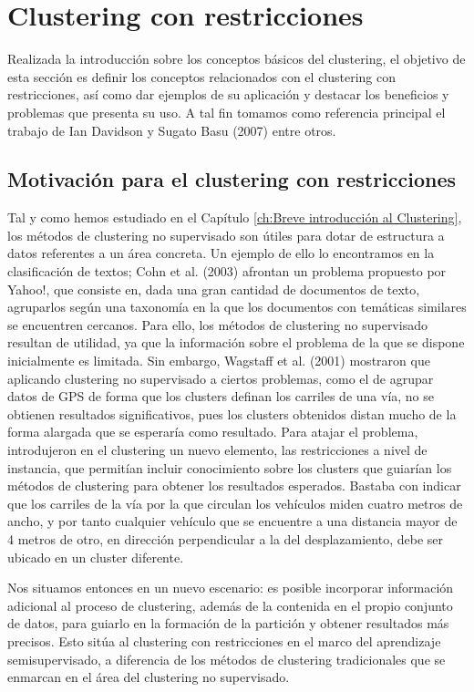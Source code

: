 \chapter{Clustering con restricciones}\label{ch:Clustering con restricciones}

Realizada la introducción sobre los conceptos básicos del clustering, el objetivo de esta sección es definir los conceptos relacionados con el clustering con restricciones, así como dar ejemplos de su aplicación y destacar los beneficios y problemas que presenta su uso. A tal fin tomamos como referencia principal el trabajo de Ian Davidson y Sugato Basu (2007) \cite{Survey:2007} entre otros.

\section{Motivación para el clustering con restricciones}

Tal y como hemos estudiado en el Capítulo \ref{ch:Breve introducción al Clustering}, los métodos de clustering no supervisado son útiles para dotar de estructura a datos referentes a un área concreta. Un ejemplo de ello lo encontramos en la clasificación de textos; Cohn et al. (2003) \cite{Cohn:2003} afrontan un problema propuesto por Yahoo!, que consiste en, dada una gran cantidad de documentos de texto, agruparlos según una taxonomía en la que los documentos con temáticas similares se encuentren cercanos. Para ello, los métodos de clustering no supervisado resultan de utilidad, ya que la información sobre el problema de la que se dispone inicialmente es limitada. Sin embargo, Wagstaff et al. (2001) mostraron que aplicando clustering no supervisado a ciertos problemas, como el de agrupar datos de GPS de forma que los clusters definan los carriles de una vía, no se obtienen resultados significativos, pues los clusters obtenidos distan mucho de la forma alargada que se esperaría como resultado. Para atajar el problema, introdujeron en el clustering un nuevo elemento, las restricciones a nivel de instancia, que permitían incluir conocimiento sobre los clusters que guiarían los métodos de clustering para obtener los resultados esperados. Bastaba con indicar que los carriles de la vía por la que circulan los vehículos miden cuatro metros de ancho, y por tanto cualquier vehículo que se encuentre a una distancia mayor de 4 metros de otro, en dirección perpendicular a la del desplazamiento, debe ser ubicado en un cluster diferente.

Nos situamos entonces en un nuevo escenario: es posible incorporar información adicional al proceso de clustering, además de la contenida en el propio conjunto de datos, para guiarlo en la formación de la partición y obtener resultados más precisos. Esto sitúa al clustering con restricciones en el marco del aprendizaje semisupervisado, a diferencia de los métodos de clustering tradicionales que se enmarcan en el área del clustering no supervisado. 

